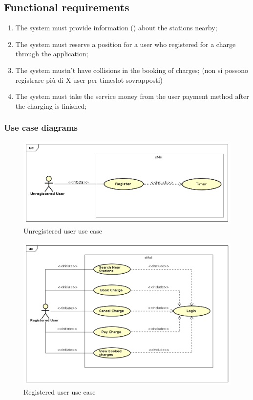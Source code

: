 \subsection{Functional requirements}

\begin{enumerate}[label=\textbf{R\arabic*}]
    \item The system must provide information () about the stations nearby;
    \item The system must reserve a position for a user who registered for a charge through the application;
    \item The system mustn't have collisions in the booking of charges; (non si possono registrare più di X user per timeslot sovrapposti)
    \item The system must take the service money from the user payment method after the charging is finished;
\end{enumerate}
\clearpage
\subsubsection{Use case diagrams}
\begin{figure}[!h]
    \includegraphics[keepaspectratio, width=16cm]{UseCase/UnregisteredUser.png}
    \caption{Unregistered user use case}
\end{figure}
\begin{figure}[!h]
    \includegraphics[keepaspectratio, width=16cm]{UseCase/RegisteredUser.png}
    \caption{Registered user use case}
\end{figure}
